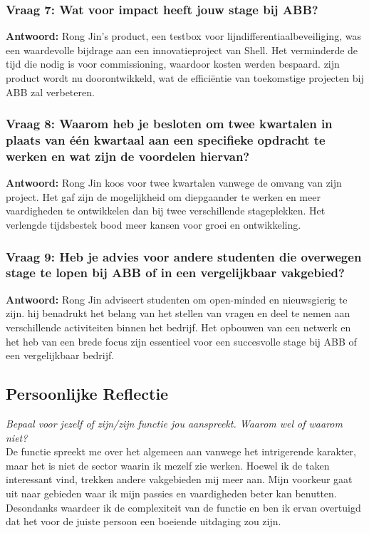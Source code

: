 \subsubsection*{Vraag 7: Wat voor impact heeft jouw stage bij ABB?}

\textbf{Antwoord:} Rong Jin's product, een testbox voor lijndifferentiaalbeveiliging, was een waardevolle bijdrage aan een innovatieproject van Shell. Het verminderde de tijd die nodig is voor commissioning, waardoor kosten werden bespaard. zijn product wordt nu doorontwikkeld, wat de efficiëntie van toekomstige projecten bij ABB zal verbeteren.

\subsubsection*{Vraag 8: Waarom heb je besloten om twee kwartalen in plaats van één kwartaal aan een specifieke opdracht te werken en wat zijn de voordelen hiervan?}

\textbf{Antwoord:} Rong Jin koos voor twee kwartalen vanwege de omvang van zijn project. Het gaf zijn de mogelijkheid om diepgaander te werken en meer vaardigheden te ontwikkelen dan bij twee verschillende stageplekken. Het verlengde tijdsbestek bood meer kansen voor groei en ontwikkeling.

\subsubsection*{Vraag 9: Heb je advies voor andere studenten die overwegen stage te lopen bij ABB of in een vergelijkbaar vakgebied?}

\textbf{Antwoord:} Rong Jin adviseert studenten om open-minded en nieuwsgierig te zijn. hij benadrukt het belang van het stellen van vragen en deel te nemen aan verschillende activiteiten binnen het bedrijf. Het opbouwen van een netwerk en het heb van een brede focus zijn essentieel voor een succesvolle stage bij ABB of een vergelijkbaar bedrijf.


\subsection{Persoonlijke Reflectie}
\textit{Bepaal voor jezelf of zijn/zijn functie jou aanspreekt. Waarom wel of waarom niet?}\\
De functie spreekt me over het algemeen aan vanwege het intrigerende karakter, maar het is niet de sector waarin ik mezelf zie werken. Hoewel ik de taken interessant vind, trekken andere vakgebieden mij meer aan. Mijn voorkeur gaat uit naar gebieden waar ik mijn passies en vaardigheden beter kan benutten. Desondanks waardeer ik de complexiteit van de functie en ben ik ervan overtuigd dat het voor de juiste persoon een boeiende uitdaging zou zijn.